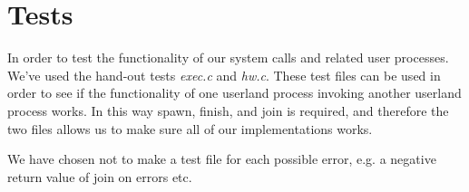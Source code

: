 \documentclass[12pt,a4paper,danish]{article}
\begin{document}
\section{Tests}
In order to test the functionality of our system calls and related user processes. We've used the hand-out tests \textit{exec.c}  and \textit{hw.c}. These test files can be used in order to see if the functionality of one userland process invoking another userland process works. In this way spawn, finish, and join is required, and therefore the two files allows us to make sure all of our implementations works.

We have chosen not to make a test file for each possible error, e.g. a negative return value of join on errors etc.
\end{document}
